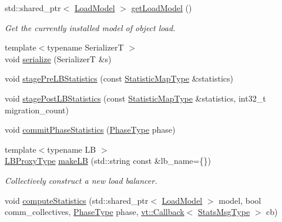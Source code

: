 \begin{DoxyCompactItemize}
std\+::shared\+\_\+ptr$<$ \hyperlink{structvt_1_1vrt_1_1collection_1_1balance_1_1_load_model}{Load\+Model} $>$ \hyperlink{structvt_1_1vrt_1_1collection_1_1balance_1_1_l_b_manager_aaa442ee117e8c9c978c77275cb3e6404}{get\+Load\+Model} ()
\begin{DoxyCompactList}\small\item\em Get the currently installed model of object load. \end{DoxyCompactList}\item 
{\footnotesize template$<$typename SerializerT $>$ }\\void \hyperlink{structvt_1_1vrt_1_1collection_1_1balance_1_1_l_b_manager_a99b59530c0557d779760394e9ff2557f}{serialize} (SerializerT \&s)
\item 
void \hyperlink{structvt_1_1vrt_1_1collection_1_1balance_1_1_l_b_manager_a252f9c83adfffa64bbad75c4bf89fce3}{stage\+Pre\+L\+B\+Statistics} (const \hyperlink{structvt_1_1vrt_1_1collection_1_1balance_1_1_l_b_manager_a3c6941b9c14a77e015047c659b817a85}{Statistic\+Map\+Type} \&statistics)
\item 
void \hyperlink{structvt_1_1vrt_1_1collection_1_1balance_1_1_l_b_manager_af60abfbc4e60ea0628f9e08eea7442f5}{stage\+Post\+L\+B\+Statistics} (const \hyperlink{structvt_1_1vrt_1_1collection_1_1balance_1_1_l_b_manager_a3c6941b9c14a77e015047c659b817a85}{Statistic\+Map\+Type} \&statistics, int32\+\_\+t migration\+\_\+count)
\item 
void \hyperlink{structvt_1_1vrt_1_1collection_1_1balance_1_1_l_b_manager_a151c019b8a964e0a13e5c49a568958e3}{commit\+Phase\+Statistics} (\hyperlink{namespacevt_a46ce6733d5cdbd735d561b7b4029f6d7}{Phase\+Type} phase)
\item 
{\footnotesize template$<$typename LB $>$ }\\\hyperlink{structvt_1_1vrt_1_1collection_1_1balance_1_1_l_b_manager_a8b1a7735366beb85c2c2ccc3912cdd80}{L\+B\+Proxy\+Type} \hyperlink{structvt_1_1vrt_1_1collection_1_1balance_1_1_l_b_manager_ababc0a22632d22eb8619bb6fd2b53dd4}{make\+LB} (std\+::string const \&lb\+\_\+name=\{\})
\begin{DoxyCompactList}\small\item\em Collectively construct a new load balancer. \end{DoxyCompactList}\item 
void \hyperlink{structvt_1_1vrt_1_1collection_1_1balance_1_1_l_b_manager_a11affdf8bb17ff6d2906c7342285d6ec}{compute\+Statistics} (std\+::shared\+\_\+ptr$<$ \hyperlink{structvt_1_1vrt_1_1collection_1_1balance_1_1_load_model}{Load\+Model} $>$ model, bool comm\+\_\+collectives, \hyperlink{namespacevt_a46ce6733d5cdbd735d561b7b4029f6d7}{Phase\+Type} phase, \hyperlink{namespacevt_a36db99df4c973d48b1118a293fff533f}{vt\+::\+Callback}$<$ \hyperlink{structvt_1_1vrt_1_1collection_1_1balance_1_1_l_b_manager_afedd89b1c2db43f087c1757db6200d36}{Stats\+Msg\+Type} $>$ cb)

\end{DoxyCompactItemize}

